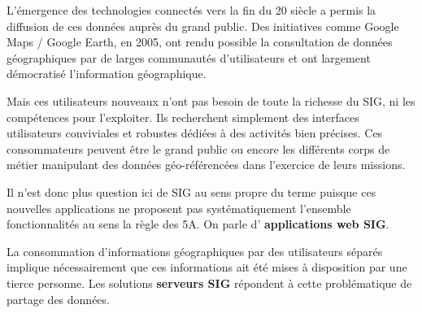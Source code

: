 \documentclass[11pt]{article}
\begin{document}
L'émergence des technologies connectés vers la fin du 20 siècle a permis la diffusion de ces données auprès du grand public. Des initiatives comme Google Maps / Google Earth, en 2005, ont rendu possible la consultation de données géographiques par de larges communautés d'utilisateurs et ont largement démocratisé l'information géographique. 

Mais ces utilisateurs nouveaux n'ont pas besoin de toute la richesse du SIG, ni les compétences pour l'exploiter. Ils recherchent simplement des interfaces utilisateurs conviviales et robustes dédiées à des activités bien précises. Ces consommateurs peuvent être le grand public ou encore les différents corps de métier manipulant des données géo-référencées dans l'exercice de leurs missions. 

Il n'est donc plus question ici de SIG au sens propre du terme puisque ces nouvelles applications ne proposent pas systématiquement l'ensemble fonctionnalités au sens la règle des 5A. On parle d' \textbf{applications web SIG}.

La consommation d'informations géographiques par des utilisateurs séparés implique nécessairement que ces informations ait été mises à disposition par une tierce personne. Les solutions \textbf{serveurs SIG} répondent à cette problématique de partage des données. 

\begin{center}
\end{center}
\end{document}
